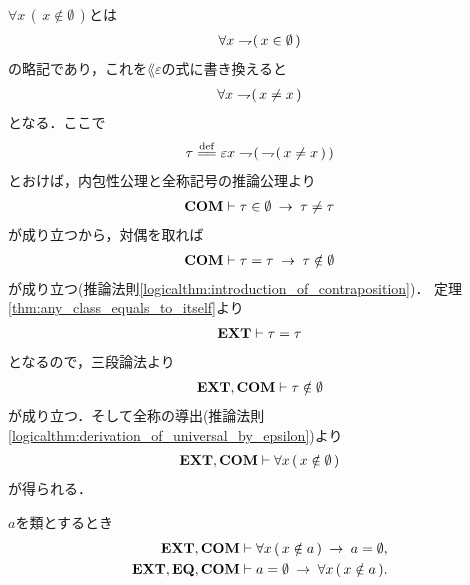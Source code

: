 	\begin{sketch}
		$\forall x\, (\, x \notin \emptyset\, )$とは
		\begin{align}
			\forall x \rightharpoondown\hspace{-0.25em} (\, x \in \emptyset\, )
		\end{align}
		の略記であり，これを$\lang{\varepsilon}$の式に書き換えると
		\begin{align}
			\forall x \rightharpoondown\hspace{-0.25em} (\, x \neq x\, )
		\end{align}
		となる．ここで
		\begin{align}
			\tau \defeq \varepsilon x \negation (\, \negation (\, x \neq x\, )\, )
		\end{align}
		とおけば，内包性公理と全称記号の推論公理より
		\begin{align}
			\mbox{\bf COM} \vdash \tau \in \emptyset \hspace{0.25em}\rightarrow\hspace{0.25em} \tau \neq \tau
		\end{align}
		が成り立つから，対偶を取れば
		\begin{align}
			\mbox{\bf COM} \vdash \tau = \tau \hspace{0.25em}\rightarrow\hspace{0.25em} \tau \notin \emptyset
		\end{align}
		が成り立つ(推論法則\ref{logicalthm:introduction_of_contraposition})．
		定理\ref{thm:any_class_equals_to_itself}より
		\begin{align}
			\mbox{{\bf EXT}} \vdash \tau = \tau
		\end{align}
		となるので，三段論法より
		\begin{align}
			\mbox{{\bf EXT}},\mbox{\bf COM} \vdash \tau \notin \emptyset
		\end{align}
		が成り立つ．そして全称の導出(推論法則\ref{logicalthm:derivation_of_universal_by_epsilon})より
		\begin{align}
			\mbox{{\bf EXT}},\mbox{\bf COM} \vdash \forall x\, (\, x \notin \emptyset\, )
		\end{align}
		が得られる．
		\QED
	\end{sketch}
	
	\begin{screen}
		\begin{thm}[空の類は空集合に等しい]\label{thm:uniqueness_of_emptyset}
			$a$を類とするとき
			\begin{align}
				\mbox{{\bf EXT}},\mbox{\bf COM} &\vdash \forall x\, (\, x \notin a\, ) \hspace{0.25em}\rightarrow\hspace{0.25em} a = \emptyset, \\
				\mbox{{\bf EXT}},\mbox{{\bf EQ}},\mbox{\bf COM} &\vdash a = \emptyset \hspace{0.25em}\rightarrow\hspace{0.25em} \forall x\, (\, x \notin a\, ).
			\end{align}
		\end{thm}
	\end{screen}
	
